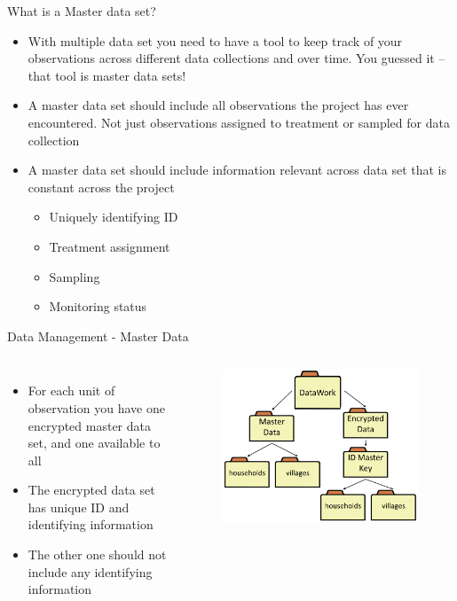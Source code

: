 \documentclass[aspectratio=169]{beamer}
\begin{document}
\begin{frame}{What is a Master data set?}
	\begin{itemize}
		\item With multiple data set you need to have a tool to keep track of your observations across different data collections and over time. You guessed it – that tool is master data sets!
		\item A master data set should include all observations the project has ever encountered. Not just observations assigned to treatment or sampled for data collection
		\item A master data set should include information relevant across data set that is constant across the project
		\begin{itemize}
			\item Uniquely identifying ID
			\item Treatment assignment
			\item Sampling
			\item Monitoring status
		\end{itemize}
	\end{itemize}
\end{frame}


\begin{frame}[fragile]{Data Management - Master Data}
	\begin{columns}[c]

		\begin{itemize}
			\item For each unit of observation you have one encrypted master data set, and one available to all
			\item The encrypted data set has unique ID and identifying information
			\item The other one should not include any identifying information
		\end{itemize}

		\begin{figure}
			\centering
			\includegraphics[width=\linewidth]{img/datamanage1}
		\end{figure}
	\end{columns}
\end{frame}
\end{document}
